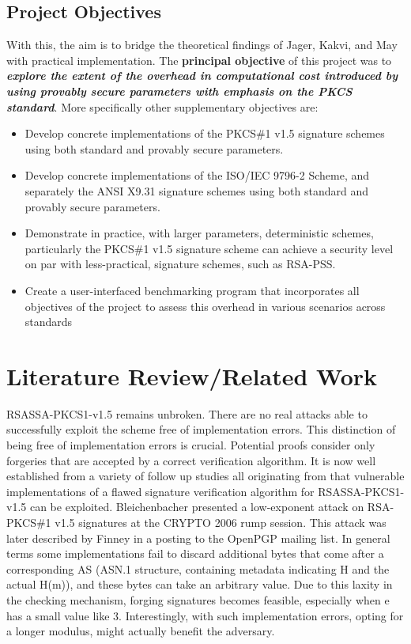 \documentclass[]{final_report}
\theoremstyle{definition}
\begin{document}
\section{Project Objectives}
With this, the aim is to bridge the theoretical findings of Jager, Kakvi, and May \cite{jager2018security} with practical implementation. The \textbf{principal objective} of this project was to \textit{\textbf{explore the extent of the overhead in computational cost introduced by using provably secure parameters with emphasis on the PKCS standard}}. More specifically other supplementary objectives are:

\begin{itemize}
    \item Develop concrete implementations of the PKCS\#1 v1.5 signature schemes using both standard and provably secure parameters.
    \item Develop concrete implementations of  the ISO/IEC 9796-2 Scheme, and separately the ANSI X9.31 signature schemes using both standard and provably secure parameters.
    \item Demonstrate in practice, with larger parameters, deterministic schemes, particularly the PKCS\#1 v1.5 signature scheme  can achieve a security level on par with less-practical, signature schemes, such as RSA-PSS.

    \item Create a user-interfaced benchmarking program that incorporates all objectives of the project to assess this overhead in various scenarios across standards
\end{itemize}



 
\chapter{Literature Review/Related Work}
RSASSA-PKCS1-v1.5 remains unbroken. There are no real attacks able to successfully exploit the scheme free of implementation errors. This distinction of being free of implementation errors is crucial. Potential proofs consider only forgeries that are accepted by a correct verification algorithm. It is now well established from a variety of follow up studies all originating from \cite{bleichenbacher1998chosen} that vulnerable implementations of a flawed signature verification algorithm for RSASSA-PKCS1-v1.5 can be exploited. Bleichenbacher presented a low-exponent attack on RSA-PKCS\#1 v1.5 signatures at the CRYPTO 2006 rump session. This attack was later described by Finney \cite{finney2006bleichenbacher} in a posting to the OpenPGP mailing list. In general terms some implementations fail to discard additional bytes that come after a corresponding AS (ASN.1 structure, containing metadata indicating H and the actual H(m)), and these bytes can take an arbitrary value. Due to this laxity in the checking mechanism, forging signatures becomes feasible, especially when e has a small value like 3. Interestingly, with such implementation errors, opting for a longer modulus, might actually benefit the adversary.
\end{document}
